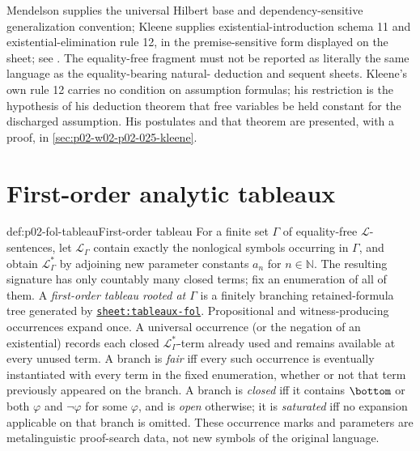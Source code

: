 Mendelson supplies the universal Hilbert base and dependency-sensitive
generalization convention; Kleene supplies existential-introduction schema 11
and existential-elimination rule 12, in the premise-sensitive form displayed
on the sheet; see \cite{Mendelson1997,Kleene1952,Enderton2001}.  The
equality-free fragment must not be
reported as literally the same language as the equality-bearing natural-
deduction and sequent sheets.  Kleene's own rule 12 carries no condition on
assumption formulas; his restriction is the hypothesis of his deduction
theorem that free variables be held constant for the discharged assumption.
His postulates and that theorem are presented, with a proof, in
\cref{sec:p02-w02-p02-025-kleene}.

\section{First-order analytic tableaux}
\label{sec:p02-tableaux-fol}

\begin{hbdefinition}{def:p02-fol-tableau}{First-order tableau}
For a finite set \(\Gamma\) of equality-free \(\mathcal L\)-sentences, let
\(\mathcal L_{\Gamma}\) contain exactly the nonlogical symbols occurring in
\(\Gamma\), and obtain \(\mathcal L_{\Gamma}^*\) by adjoining new parameter
constants \(a_n\) for \(n\in\mathbb N\).  The resulting signature has only
countably many closed terms; fix an enumeration of all of them.  A
\emph{first-order tableau rooted at \(\Gamma\)}
is a finitely branching
retained-formula tree generated by
\hyperref[sheet:tableaux-fol]{\texttt{sheet:tableaux-fol}}.  Propositional
and witness-producing occurrences expand once.  A universal occurrence (or
the negation of an existential) records each closed
\(\mathcal L_{\Gamma}^*\)-term already used and remains available at every
unused term.  A branch is \emph{fair} iff every such occurrence is eventually
instantiated with every term in the fixed enumeration, whether or not that
term previously appeared on the branch.  A branch is \emph{closed} iff it
contains \(\bottom\) or
both \(\varphi\) and \(\neg\varphi\) for some \(\varphi\), and is \emph{open}
otherwise; it is \emph{saturated} iff no expansion applicable on that branch
is omitted.  These occurrence marks and parameters are
metalinguistic proof-search data, not new symbols of the original language.
\end{hbdefinition}

